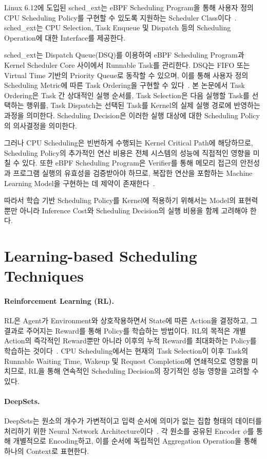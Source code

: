 Linux 6.12에 도입된 sched\_ext는 eBPF Scheduling Program을 통해
사용자 정의 CPU Scheduling Policy를 구현할 수 있도록
지원하는 Scheduler Class이다~\cite{schedext}.
sched\_ext는 CPU Selection, Task Enqueue 및 Dispatch 등의
Scheduling Operation에 대한 Interface를 제공한다.

sched\_ext는 Dispatch Queue(DSQ)를 이용하여 eBPF Scheduling Program과
Kernel Scheduler Core 사이에서 Runnable Task를 관리한다.
DSQ는 FIFO 또는 Virtual Time 기반의 Priority Queue로
동작할 수 있으며, 이를 통해 사용자 정의 Scheduling Metric에
따른 Task Ordering을 구현할 수 있다~\cite{schedext}.
본 논문에서 Task Ordering은 Task 간 상대적인 실행 순서를,
Task Selection은 다음 실행할 Task를 선택하는 행위를,
Task Dispatch는 선택된 Task를 Kernel의 실제 실행 경로에
반영하는 과정을 의미한다. Scheduling Decision은 이러한 실행 대상에
대한 Scheduling Policy의 의사결정을 의미한다.

그러나 CPU Scheduling은 빈번하게 수행되는 Kernel Critical
Path에 해당하므로, Scheduling Policy의 추가적인 연산 비용은
전체 시스템의 성능에 직접적인 영향을 미칠 수 있다.
또한 eBPF Scheduling Program은 Verifier를 통해 메모리 접근의 안전성과
프로그램 실행의 유효성을 검증받아야 하므로, 복잡한 연산을
포함하는 Machine Learning Model을 구현하는 데 제약이 존재한다~\cite{bpfverifier,ebpfruntime}.

따라서 학습 기반 Scheduling Policy를 Kernel에 적용하기
위해서는 Model의 표현력뿐만 아니라 Inference Cost와
Scheduling Decision의 실행 비용을 함께 고려해야 한다.


\section{Learning-based Scheduling Techniques}
\label{sec:background-learning-based-scheduling-techniques}

\paragraph{Reinforcement Learning (RL).}
RL은 Agent가 Environment와 상호작용하면서 State에 따른
Action을 결정하고, 그 결과로 주어지는 Reward를 통해
Policy를 학습하는 방법이다.
RL의 목적은 개별 Action의 즉각적인 Reward뿐만 아니라
이후의 누적 Reward를 최대화하는 Policy를 학습하는 것이다~\cite{sutton2018}.
CPU Scheduling에서는 현재의 Task Selection이 이후 Task의
Runnable Waiting Time, Wakeup 및 Request Completion에 연쇄적으로 영향을
미치므로, RL을 통해 연속적인 Scheduling Decision의
장기적인 성능 영향을 고려할 수 있다.

\paragraph{DeepSets.}
DeepSets는 원소의 개수가 가변적이고 입력 순서에 의미가
없는 집합 형태의 데이터를 처리하기 위한 Neural Network
Architecture이다~\cite{deepsets}.
각 원소를 공유된 Encoder $\phi$를 통해 개별적으로
Encoding하고, 이를 순서에 독립적인 Aggregation
Operation을 통해 하나의 Context로 표현한다.

